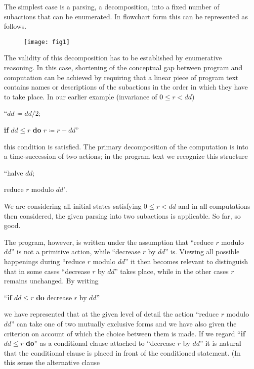The simplest case is a parsing, a decomposition, into a fixed number of subactions that can be enumerated. In flowchart form this can be represented as follows. 

\begin{figure}[h]
	\centering
	\texttt{[image: fig1]}
\end{figure}

The validity of this decomposition has to be established by enumerative reasoning. In this case, shortening of the conceptual gap between program and computation can be achieved by requiring that a linear piece of program text contains names or descriptions of the subactions in the order in which they have to take place. In our earlier example (invariance of $0 \leqslant r < dd$)
\medskip

{
	\setlength{\parindent}{8em}
	\hspace{-.5em}``$dd \coloneq dd/2;$
	
	\textbf{if} $dd \leqslant r$ \textbf{do} $r \coloneq r - dd$''
}
\medskip

\noindent
this condition is satisfied. The primary decomposition of the computation is into a time-succession of two actions; in the program text we recognize this structure
\medskip

{
	\setlength{\parindent}{8em}
	\hspace{-.5em}``halve $dd;$
	
	reduce $r$ modulo $dd$".
}
\medskip

We are considering all initial states satisfying $0 \leqslant r < dd$ and in all computations then considered, the given parsing into two subactions is applicable. So far, so good.

The program, however, is written under the assumption that ``reduce $r$ modulo $dd$'' is not a primitive action, while ``decrease $r$ by $dd$'' is. Viewing all possible happenings during ``reduce $r$ modulo $dd$'' it then becomes relevant to distinguish that in some cases ``decrease $r$ by $dd$'' takes place, while in the other cases $r$ remains unchanged. By writing
\medskip

{
	\setlength{\parindent}{8em}
	\hspace{-.5em}``\textbf{if} $dd \leqslant r$ \textbf{do} decrease $r$ by $dd$''
}
\medskip

\noindent
we have represented that at the given level of detail the action ``reduce $r$ modulo $dd$'' can take one of two mutually exclusive forms and we have also given the criterion on account of which the choice between them is made. If we regard ``\textbf{if} $dd \leqslant r$ \textbf{do}'' as a conditional clause attached to ``decrease $r$ by $dd$'' it is natural that the conditional clause is placed in front of the conditioned statement. (In this sense the alternative clause
\medskip

